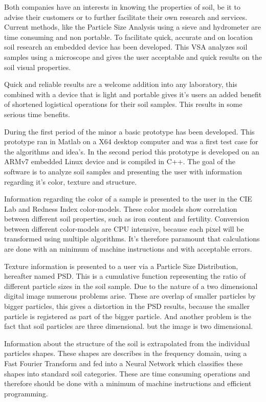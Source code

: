 \documentclass[11pt,fleqn,,a4paper,twoside,openright]{book}
\begin{document}
Both companies have an interests in knowing the properties of soil, be it to advise their customers or to further facilitate their own research and services. Current methods, like the Particle Size Analysis using a sieve and hydrometer are time consuming and non portable. To facilitate quick, accurate and on location soil research an embedded device has been developed. This VSA analyzes soil samples using a microscope and gives the user acceptable and quick results on the soil visual properties.

Quick and reliable results are a welcome addition into any laboratory, this combined with a device that is light and portable gives it's users an added benefit of shortened logistical operations for their soil samples. This results in some serious time benefits.

During the first period of the minor a basic prototype has been developed. This prototype ran in Matlab on a X64 desktop computer and was a first test case for the algorithms and idea's. In the second period this prototype is developed on an ARMv7 embedded Linux device and is compiled in C++. The goal of the software is to analyze soil samples and presenting the user with information regarding it's color, texture and structure.

Information regarding the color of a sample is presented to the user in the CIE Lab and Redness Index color-models. These color models show correlation between different soil properties, such as iron content and fertility. Conversion between different color-models are CPU intensive, because each pixel will be transformed using multiple algorithms. It's therefore paramount that calculations are done with an minimum of machine instructions and with acceptable errors.

Texture information is presented to a user via a Particle Size Distribution, hereafter named PSD. This is a cumulative function representing the ratio of different particle sizes in the soil sample. Due to the nature of a two dimensional digital image numerous problems arise. These are overlap of smaller particles by bigger particles, this gives a distortion in the PSD results, because the smaller particle is registered as part of the bigger particle. And another problem is the fact that soil particles are three dimensional. but the image is two dimensional.

Information about the structure of the soil is extrapolated from the individual particles shapes. These shapes are describes in the frequency domain, using a Fast Fourier Transform and fed into a Neural Network which classifies these shapes into standard soil categories. These are time consuming operations and therefore should be done with a minimum of machine instructions and efficient programming.
\end{document}
